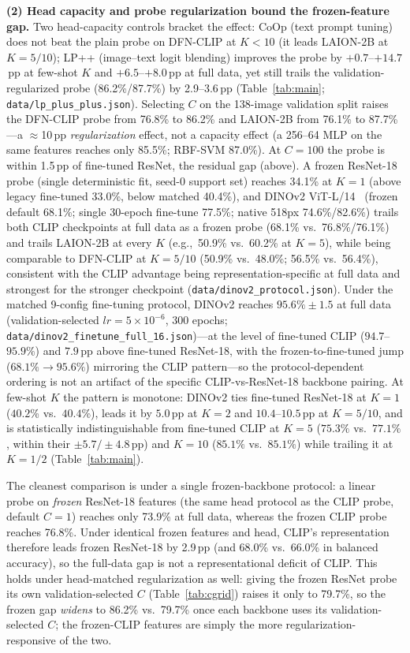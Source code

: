\documentclass[10pt,a4paper]{article}
\begin{document}
\textbf{(2) Head capacity and probe regularization bound the frozen-feature gap.} Two head-capacity controls bracket the effect: CoOp (text prompt tuning) does not beat the plain probe on DFN-CLIP at $K{<}10$ (it leads LAION-2B at $K{=}5/10$); LP++ (image--text logit blending) improves the probe by $+0.7$--$+14.7$\,pp at few-shot $K$ and $+6.5$--$+8.0$\,pp at full data, yet still trails the validation-regularized probe (86.2\%/87.7\%) by 2.9--3.6\,pp (Table~\ref{tab:main}; \texttt{data/lp\_plus\_plus.json}). Selecting $C$ on the 138-image validation split raises the DFN-CLIP probe from 76.8\% to 86.2\% and LAION-2B from 76.1\% to 87.7\%---a $\approx$10\,pp \emph{regularization} effect, not a capacity effect (a 256--64 MLP on the same features reaches only 85.5\%; RBF-SVM 87.0\%). At $C{=}100$ the probe is within 1.5\,pp of fine-tuned ResNet, the residual gap (above). A frozen ResNet-18 probe (single deterministic fit, seed-0 support set) reaches 34.1\% at $K{=}1$ (above legacy fine-tuned 33.0\%, below matched 40.4\%), and DINOv2 ViT-L/14~\cite{dinov2} (frozen default 68.1\%; single 30-epoch fine-tune 77.5\%; native 518px 74.6\%/82.6\%) trails both CLIP checkpoints at full data as a frozen probe (68.1\% vs.\ 76.8\%/76.1\%) and trails LAION-2B at every $K$ (e.g.,\ 50.9\% vs.\ 60.2\% at $K{=}5$), while being comparable to DFN-CLIP at $K{=}5/10$ (50.9\% vs.\ 48.0\%; 56.5\% vs.\ 56.4\%), consistent with the CLIP advantage being representation-specific at full data and strongest for the stronger checkpoint (\texttt{data/dinov2\_protocol.json}). Under the matched 9-config fine-tuning protocol, DINOv2 reaches $95.6\%\pm1.5$ at full data (validation-selected $lr{=}5{\times}10^{-6}$, 300 epochs; \texttt{data/dinov2\_finetune\_full\_16.json})---at the level of fine-tuned CLIP ($94.7$--$95.9\%$) and $7.9$\,pp above fine-tuned ResNet-18, with the frozen-to-fine-tuned jump ($68.1\%\rightarrow95.6\%$) mirroring the CLIP pattern---so the protocol-dependent ordering is not an artifact of the specific CLIP-vs-ResNet-18 backbone pairing. At few-shot $K$ the pattern is monotone: DINOv2 ties fine-tuned ResNet-18 at $K{=}1$ ($40.2$\% vs.\ $40.4$\%), leads it by $5.0$\,pp at $K{=}2$ and $10.4$--$10.5$\,pp at $K{=}5/10$, and is statistically indistinguishable from fine-tuned CLIP at $K{=}5$ ($75.3\%$ vs.\ $77.1\%$, within their $\pm5.7/\pm4.8$\,pp) and $K{=}10$ ($85.1\%$ vs.\ $85.1\%$) while trailing it at $K{=}1/2$ (Table~\ref{tab:main}).

The cleanest comparison is under a single frozen-backbone protocol: a linear probe on \emph{frozen} ResNet-18 features (the same head protocol as the CLIP probe, default $C{=}1$) reaches only 73.9\% at full data, whereas the frozen CLIP probe reaches 76.8\%. Under identical frozen features and head, CLIP's representation therefore leads frozen ResNet-18 by 2.9\,pp (and 68.0\% vs.\ 66.0\% in balanced accuracy), so the full-data gap is not a representational deficit of CLIP. This holds under head-matched regularization as well: giving the frozen ResNet probe its own validation-selected $C$ (Table~\ref{tab:cgrid}) raises it only to 79.7\%, so the frozen gap \emph{widens} to 86.2\% vs.\ 79.7\% once each backbone uses its validation-selected $C$; the frozen-CLIP features are simply the more regularization-responsive of the two.
\end{document}
